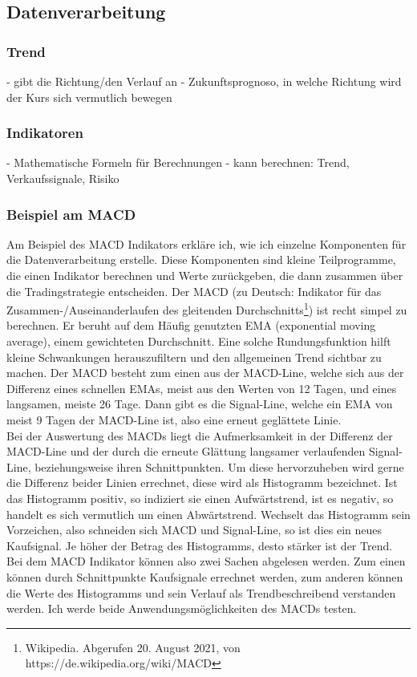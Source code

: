 \documentclass[12pt]{article}
\begin{document}
\subsection{Datenverarbeitung}
	\subsubsection{Trend}
		- gibt die Richtung/den Verlauf an
		- Zukunftsprognoso, in welche Richtung wird der Kurs sich vermutlich bewegen
	\subsubsection{Indikatoren}
		- Mathematische Formeln für Berechnungen
		- kann berechnen: Trend, Verkaufssignale, Risiko
	\subsubsection{Beispiel am MACD}
		Am Beispiel des MACD Indikators erkläre ich, wie ich einzelne Komponenten für die Datenverarbeitung erstelle. Diese Komponenten sind kleine Teilprogramme, die einen Indikator berechnen und Werte zurückgeben, die dann zusammen über die Tradingstrategie entscheiden.
		Der MACD (zu Deutsch: Indikator für das Zusammen-/Auseinanderlaufen des gleitenden Durchschnitts\footnote{Wikipedia. Abgerufen 20. August 2021, von https://de.wikipedia.org/wiki/MACD}) ist recht simpel zu berechnen. Er beruht auf dem Häufig genutzten EMA (exponential moving average), einem gewichteten Durchschnitt. Eine solche Rundungsfunktion hilft kleine Schwankungen herauszufiltern und den allgemeinen Trend sichtbar zu machen. Der MACD besteht zum einen aus der MACD-Line, welche sich aus der Differenz eines schnellen EMAs, meist aus den Werten von 12 Tagen, und eines langsamen, meiste 26 Tage. Dann gibt es die Signal-Line, welche ein EMA von meist 9 Tagen der MACD-Line ist, also eine erneut geglättete Linie.\\
		Bei der Auswertung des MACDs liegt die Aufmerksamkeit in der Differenz der MACD-Line und der durch die erneute Glättung langsamer verlaufenden Signal-Line, beziehungsweise ihren Schnittpunkten. Um diese hervorzuheben wird gerne die Differenz beider Linien errechnet, diese wird als Histogramm bezeichnet. Ist das Histogramm positiv, so indiziert sie einen Aufwärtstrend, ist es negativ, so handelt es sich vermutlich um einen Abwärtstrend. Wechselt das Histogramm sein Vorzeichen, also schneiden sich MACD und Signal-Line, so ist dies ein neues Kaufsignal. Je höher der Betrag des Histogramms, desto stärker ist der Trend.\\
		Bei dem MACD Indikator können also zwei Sachen abgelesen werden. Zum einen können durch Schnittpunkte Kaufsignale errechnet werden, zum anderen können die Werte des Histogramms und sein Verlauf als Trendbeschreibend verstanden werden. Ich werde beide Anwendungsmöglichkeiten des MACDs testen.
\end{document}
